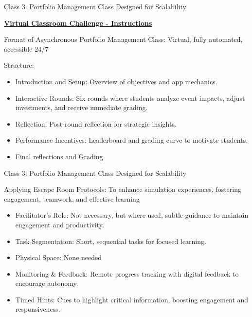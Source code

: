 \documentclass[
  ignorenonframetext,
]{beamer}
\providecommand{\tightlist}{%
  \setlength{\itemsep}{0pt}\setlength{\parskip}{0pt}}
\begin{document}
\begin{frame}{Class 3: Portfolio Management Class Designed for
Scalability}
\label{class-3-portfolio-management-class-designed-for-scalability}
\small

\textbf{\href{https://github.com/westland/Fulbright/blob/main/portfolio_mngt_virtual_class.pdf}{Virtual
Classroom Challenge - Instructions}}

Format of Asynchronous Portfolio Management Class: Virtual, fully
automated, accessible 24/7

Structure:

\begin{itemize}
\tightlist
\item
  Introduction and Setup: Overview of objectives and app mechanics.
\item
  Interactive Rounds: Six rounds where students analyze event impacts,
  adjust investments, and receive immediate grading.
\item
  Reflection: Post-round reflection for strategic insights.
\item
  Performance Incentives: Leaderboard and grading curve to motivate
  students.
\item
  Final reflections and Grading
\end{itemize}
\end{frame}

\begin{frame}{Class 3: Portfolio Management Class Designed for
Scalability}
\label{class-3-portfolio-management-class-designed-for-scalability-1}
\small

Applying Escape Room Protocols: To enhance simulation experiences,
fostering engagement, teamwork, and effective learning

\begin{itemize}
\tightlist
\item
  Facilitator's Role: Not necessary, but where used, subtle guidance to
  maintain engagement and productivity.
\item
  Task Segmentation: Short, sequential tasks for focused learning.
\item
  Physical Space: None needed
\item
  Monitoring \& Feedback: Remote progress tracking with digital feedback
  to encourage autonomy.
\item
  Timed Hints: Cues to highlight critical information, boosting
  engagement and responsiveness.
\end{itemize}
\end{frame}
\end{document}
